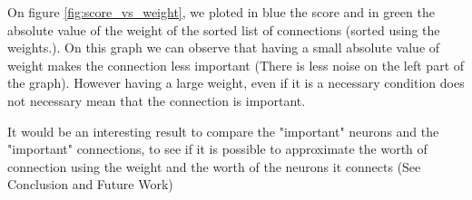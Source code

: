 On figure \ref{fig:score_vs_weight}, we ploted in blue the score and in green the absolute value of the weight of the sorted list of connections (sorted using the weights.). On this graph we can observe that having a small absolute value of weight makes the connection less important (There is less noise on the left part of the graph). However having a large weight, even if it is a necessary condition does not necessary mean that the connection is important. 

It would be an interesting result to compare the "important" neurons and the "important" connections, to see if it is possible to approximate the worth of connection using the weight and the worth of the neurons it connects (See Conclusion and Future Work) 
